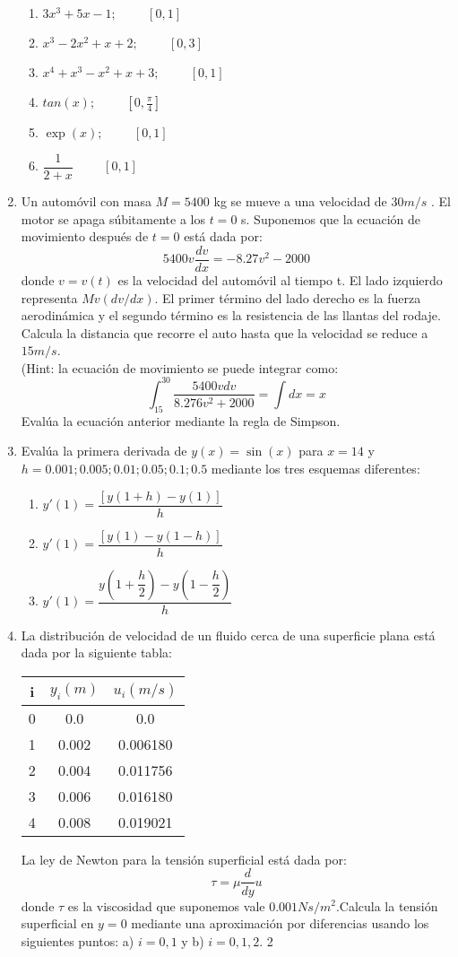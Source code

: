 \documentclass[11pt]{article}
\begin{document}
\begin{enumerate}
\begin{enumerate}
\item $3x^{3} + 5x - 1; \hspace{1cm} [0, 1]$
\item $x^{3} - 2x^{2} + x + 2; \hspace{1cm}[0, 3]$
\item $x^{4} + x^{3} - x^{2} + x + 3; \hspace{1cm} [0, 1]$
\item $tan(x); \hspace{1cm} [0, \frac{\pi}{4}]$
\item $\exp(x); \hspace{1cm} [0, 1]$
\item $ \dfrac{1}{2+x}\hspace{1cm} [0, 1]$
\end{enumerate}
\item Un automóvil con masa $M = 5400$ kg se mueve a una velocidad de $30 m/s$ . El motor se apaga súbitamente a los $t = 0$ s. Suponemos que la ecuación de movimiento después de $t = 0$ está dada por:
\[ 5400v \dfrac{dv}{dx} = -8.27v^{2} - 2000
\]
donde $v = v(t)$ es la velocidad del automóvil al tiempo t. El lado izquierdo representa $Mv(dv/dx)$. El primer término del lado derecho es la fuerza aerodinámica y el segundo término es la resistencia de las llantas del rodaje. Calcula la distancia que recorre el auto hasta que la velocidad se reduce a $15 m/s$.\\
(Hint: la ecuación de movimiento se puede integrar como:
\[ \int_{15}^{30} \dfrac{5400 v dv}{8.276 v^{2}+2000} =  \int dx = x \]
Evalúa la ecuación anterior mediante la regla de Simpson.
\item Evalúa la primera derivada de $y(x) = \sin(x)$ para $x = 14$ y $h = 0.001; 0.005; 0.01; 0.05; 0.1; 0.5$ mediante los tres esquemas diferentes:
\begin{enumerate}
\item $ y'(1) = \dfrac{[y(1 + h) - y(1)]}{h}$
\item $y'(1) = \dfrac{[y(1) - y(1 - h)]}{h}$
\item $y'(1) = \dfrac{y(1 + \dfrac{h}{2})-y(1-\dfrac{h}{2})}{h}$
\end{enumerate}
\item La distribución de velocidad de un fluido cerca de una superficie plana está dada por la siguiente tabla:
\begin{center}
\begin{tabular}{c | c | c}
i & $y_{i}(m)$ & $u_{i}(m/s)$ \\
\hline 0 & 0.0 & 0.0 \\
1 & 0.002 & 0.006180 \\
2 & 0.004 & 0.011756 \\
3 & 0.006 & 0.016180 \\
4 & 0.008 & 0.019021
\end{tabular}
\end{center}
La ley de Newton para la tensión superficial está dada por:
\[\tau = \mu \dfrac{d}{dy} u\]
donde $\tau$ es la viscosidad que suponemos vale $0.001Ns/m^{2}$.Calcula la tensión superficial en $y = 0$ mediante una aproximación por diferencias usando los siguientes puntos: a) $i = 0, 1$ y b) $i = 0, 1, 2$.
2
\end{enumerate}
\end{document}

